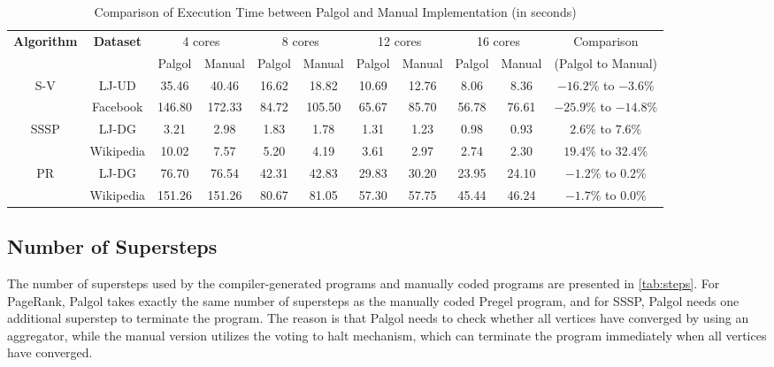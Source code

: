 \documentclass{sokendai_thesis} %
\begin{document}
\begin{table}[t]
 \centering
 \caption{Comparison of Execution Time between Palgol and Manual Implementation (in seconds)}
 \label{tab:exec}
 \begin{tabular}{c|c||c|c||c|c||c|c||c|c||c}
  \hline
  \multirow{2}{*}{\textbf{Algorithm}} & \multirow{2}{*}{\textbf{Dataset}} & \multicolumn{2}{c||}{4 cores} & \multicolumn{2}{c||}{8 cores} & \multicolumn{2}{c||}{12 cores} & \multicolumn{2}{c||}{16 cores} & Comparison \\
  \cline{3-10}
  & & Palgol & Manual & Palgol & Manual & Palgol & Manual & Palgol & Manual & (Palgol to Manual) \\
  \hline\hline
  \multirow{2}{*}{S-V} & LJ-UD & 35.46 & 40.46 & 16.62 & 18.82 & 10.69 & 12.76 & 8.06 & 8.36 & $-16.2\%$ to $-3.6\%$ \\
  \cline{2-11}
  & Facebook & 146.80 & 172.33 & 84.72 & 105.50 & 65.67 & 85.70 & 56.78 & 76.61 & $-25.9\%$ to $-14.8\%$ \\
  \hline
  \multirow{2}{*}{SSSP} & LJ-DG & 3.21 & 2.98 & 1.83 & 1.78 & 1.31 & 1.23 & 0.98 & 0.93 & $2.6\%$ to $7.6\%$ \\
  \cline{2-11}
  & Wikipedia & 10.02 & 7.57 & 5.20 & 4.19 & 3.61 & 2.97 & 2.74 & 2.30 & $19.4\%$ to $32.4\%$ \\
  \hline
  \multirow{2}{*}{PR} & LJ-DG & 76.70 & 76.54 & 42.31 & 42.83 & 29.83 & 30.20 & 23.95 & 24.10 & $-1.2\%$ to $0.2\%$ \\
  \cline{2-11}
  & Wikipedia & 151.26 & 151.26 & 80.67 & 81.05 & 57.30 & 57.75 & 45.44 & 46.24 & $-1.7\%$ to $0.0\%$ \\
  \hline
 \end{tabular}
\end{table}

\subsection{Number of Supersteps}

The number of supersteps used by the compiler-generated programs and manually coded programs are presented in \autoref{tab:steps}.
For PageRank, Palgol takes exactly the same number of supersteps as the manually coded Pregel program, and for SSSP, Palgol needs one additional superstep to terminate the program.
The reason is that Palgol needs to check whether all vertices have converged by using an aggregator, while the manual version utilizes the voting to halt mechanism, which can terminate the program immediately when all vertices have converged.
\end{document}
